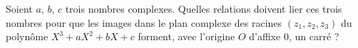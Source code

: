 Soient $a$, $b$, $c$ trois nombres complexes. Quelles relations
doivent lier ces trois nombres pour que les images dans le plan
complexe des racines $ (z_{1},z_{2},z_{3})$ du polyn{\^o}me
$X^{3}+a{}X^{2}+b{}X+c$ forment, avec l'origine $O$ d'affixe 0, un
carr{\'e} ?
